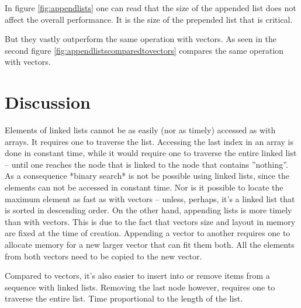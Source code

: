 \documentclass[a4paper, 11pt]{article}
\begin{document}
    In figure \ref{fig:appendlists} one can read that the size of the appended list
    does not affect the overall performance. It is the size of the prepended list that is critical. 
    
    But they vastly outperform the same operation with vectors. 
    As seen in the second figure \ref{fig:appendlistscomparedtovectors}
    compares the same operation with vectors. 

    \clearpage
    \section*{Discussion}
Elements of linked lists cannot be as easily (nor as timely) accessed as with arrays. 
It requires one to traverse the list. 
Accessing the last index in an array is done in constant time, 
while it would require one to traverse the entire linked list -- until one
reaches the node that is linked to the node that contains ''nothing''.
As a consequence *binary search* is not be possible using linked lists, 
since the elements can not be accessed in constant time. 
Nor is it possible to locate the maximum element as fast as with vectors 
-- unless, perhaps, it's a linked list that is sorted in descending order.  
On the other hand, appending lists is more timely than with vectors. 
This is due to the fact that vectors size and layout in memory are fixed at the 
time of creation. 
Appending a vector to another requires one to allocate memory for a new larger vector 
that can fit them both. 
All the elements from both vectors need to be copied to the new vector. 

Compared to vectors, it's also easier to insert into or remove items from 
a sequence with linked lists. 
Removing the last node however, requires one to traverse the entire list. 
Time proportional to the length of the list.


\end{document}
